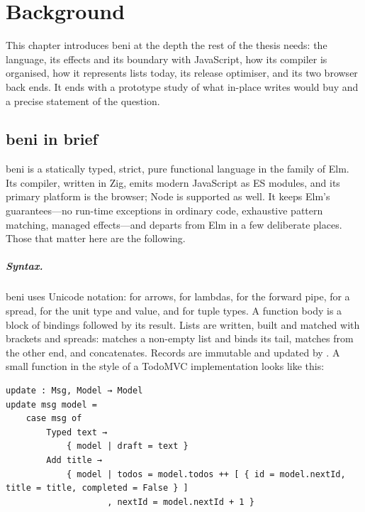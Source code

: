 \chapter{Background}
\label{sec:background}

This chapter introduces beni at the depth the rest of the thesis needs: the language, its effects
and its boundary with JavaScript, how its compiler is organised, how it represents lists today, its
release optimiser, and its two browser back ends. It ends with a prototype study of what in-place
writes would buy and a precise statement of the question.

\section{beni in brief}
\label{sec:bg-beni}

beni is a statically typed, strict, pure functional language in the family of Elm. Its compiler,
written in Zig, emits modern JavaScript as ES modules, and its primary platform is the browser; Node
is supported as well. It keeps Elm's guarantees---no run-time exceptions in ordinary code,
exhaustive pattern matching, managed effects---and departs from Elm in a few deliberate places.
Those that matter here are the following.

\paragraph{Syntax.} beni uses Unicode notation:  for arrows,  for lambdas,
 for the forward pipe,  for a spread,  for the unit type and value, and
 for tuple types. A function body is a block of bindings followed by its result. Lists are
written, built and matched with brackets and spreads: \code{[ x, …rest ]} matches a non-empty
list and binds its tail,  matches from the other end, and \code{[ …xs, …ys ]}
concatenates. Records are immutable and updated by .
A small  function in the style of a TodoMVC implementation looks like this:
\begin{Verbatim}
update : Msg, Model → Model
update msg model =
    case msg of
        Typed text →
            { model | draft = text }
        Add title →
            { model | todos = model.todos ++ [ { id = model.nextId, title = title, completed = False } ]
                    , nextId = model.nextId + 1 }
\end{Verbatim}

